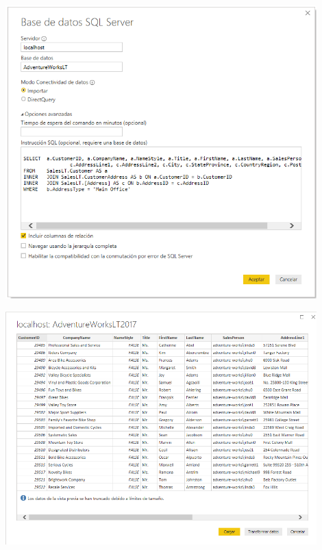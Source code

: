 \begin{center}
\includegraphics[width=12cm]{./Imagenes/img_01} 
\end{center}

\begin{center}
\includegraphics[width=12cm]{./Imagenes/img_02} 
\end{center}
    
